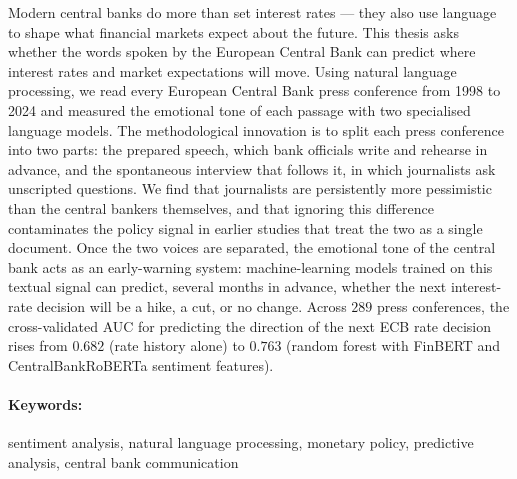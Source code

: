 Modern central banks do more than set interest rates --- they also use language to shape what financial markets expect about the future. This thesis asks whether the words spoken by the European Central Bank can predict where interest rates and market expectations will move. Using natural language processing, we read every European Central Bank press conference from 1998 to 2024 and measured the emotional tone of each passage with two specialised language models. The methodological innovation is to split each press conference into two parts: the prepared speech, which bank officials write and rehearse in advance, and the spontaneous interview that follows it, in which journalists ask unscripted questions. We find that journalists are persistently more pessimistic than the central bankers themselves, and that ignoring this difference contaminates the policy signal in earlier studies that treat the two as a single document. Once the two voices are separated, the emotional tone of the central bank acts as an early-warning system: machine-learning models trained on this textual signal can predict, several months in advance, whether the next interest-rate decision will be a hike, a cut, or no change. Across $289$ press conferences, the cross-validated AUC for predicting the direction of the next ECB rate decision rises from $0.682$ (rate history alone) to $0.763$ (random forest with FinBERT and CentralBankRoBERTa sentiment features).

\paragraph*{Keywords:} 
sentiment analysis, natural language processing, monetary policy, predictive analysis, central bank communication
